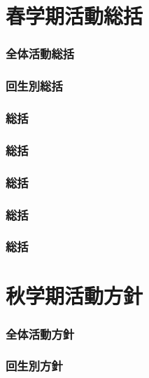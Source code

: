 \part{春学期活動総括}
\section{全体活動総括}


\section{回生別総括}





\section{\kaikeiDepartment{}総括}

\section{\kensuiDepartment{}総括}

\section{\syogaiDepartment{}総括}

\section{\systemDepartment{}総括}

\section{\soumuDepartment{}総括}


\newpage
\part{秋学期活動方針}
\section{全体活動方針}


\section{回生別方針}





